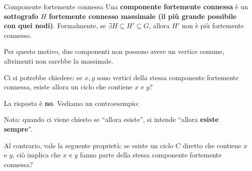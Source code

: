 \documentclass[12pt]{report}
\begin{document}
	\begin{definizione}{Componente fortemente connessa}{}
		Una \textbf{componente fortemente connessa} è un \textbf{sottografo $H$ fortemente connesso massimale (il più grande possibile con quei nodi)}. Formalmente, se $\exists H \subseteq H' \subseteq G$, allora $H'$ non è più fortemente connesso.
	\end{definizione}
	
	Per questo motivo, due componenti non possono avere un vertice comune, altrimenti non sarebbe la massimale.
	
	Ci si potrebbe chiedere: se $x, y$ sono vertici della stessa componente fortemente connessa, esiste allora un ciclo che contiene $x$ e $y$?
	
	La risposta è \textbf{no}. Vediamo un controesempio:
	
	\begin{figure}[H]
		\centering
	\end{figure}
	
	Nota: quando ci viene chiesto se ``allora esiste'', si intende ``allora \textbf{esiste sempre}''.
	
	Al contrario, vale la seguente proprietà: se esiste un ciclo $C$ diretto che contiene $x$ e $y$, ciò implica che $x$ e $y$ fanno parte della stessa componente fortemente connessa?\\
	
\end{document}
